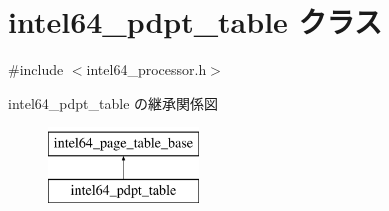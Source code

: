 \hypertarget{classintel64__pdpt__table}{}\section{intel64\+\_\+pdpt\+\_\+table クラス}
\label{classintel64__pdpt__table}


{\ttfamily \#include $<$intel64\+\_\+processor.\+h$>$}

intel64\+\_\+pdpt\+\_\+table の継承関係図\begin{figure}[H]
\begin{center}
\leavevmode
\includegraphics[height=2.000000cm]{classintel64__pdpt__table}
\end{center}
\end{figure}
